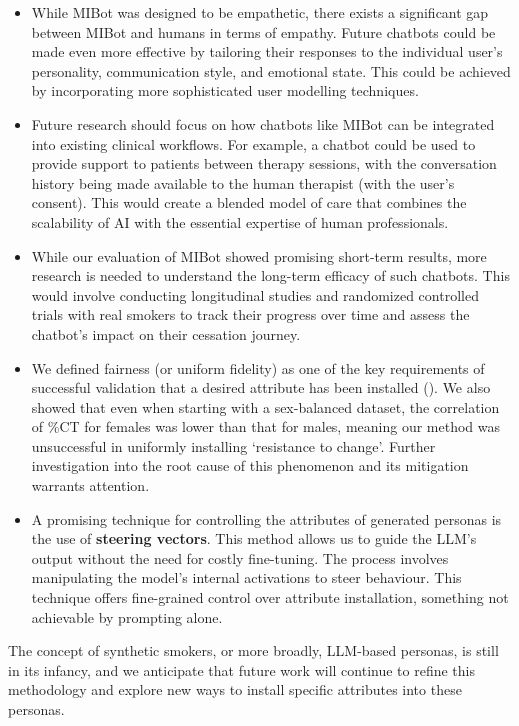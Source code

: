\begin{itemize}
	\item While MIBot was designed to be empathetic, there exists a significant gap between MIBot
	      and humans in terms of empathy. Future chatbots could be made even more effective by
	      tailoring their responses to the individual user's personality, communication style,
	      and emotional state. This could be achieved by incorporating more sophisticated user
	      modelling techniques.
	\item Future research should focus on how chatbots like MIBot can be integrated into existing
	      clinical workflows. For example, a chatbot could be used to provide support to patients
	      between therapy sessions, with the conversation history being made available to the
	      human therapist (with the user's consent). This would create a blended model of care
	      that combines the scalability of AI with the essential expertise of human
	      professionals.
	\item While our evaluation of MIBot showed promising short-term results, more research is
	      needed to understand the long-term efficacy of such chatbots. This would involve
	      conducting longitudinal studies and randomized controlled trials with real smokers to
	      track their progress over time and assess the chatbot's impact on their cessation
	      journey.
	\item  We defined fairness (or uniform fidelity) as one of the key requirements of successful
	      validation that a desired attribute has been installed (). We
	      also showed that even when starting with a sex-balanced dataset, the correlation of
	      \%CT for females was lower than that for males, meaning our method was unsuccessful in
	      uniformly installing `resistance to change'. Further investigation into the root cause
	      of this phenomenon and its mitigation warrants attention.
	\item A promising technique for controlling the attributes of generated personas is the use
	      of \textbf{steering vectors}. This method allows us to guide the LLM's output without
	      the need for costly fine-tuning. The process involves manipulating the model's internal
	      activations to steer behaviour. This technique offers fine-grained control over
	      attribute installation, something not achievable by prompting alone.
\end{itemize}

The concept of synthetic smokers, or more broadly, LLM-based personas, is still in its
infancy, and we anticipate that future work will continue to refine this methodology
and explore new ways to install specific attributes into these personas.

